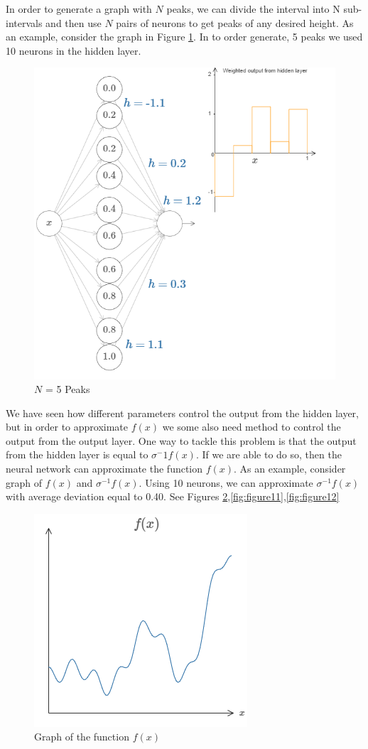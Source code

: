 \documentclass{article}
\begin{document}
In order to generate a graph with $N$ peaks, we can divide the interval into N sub-intervals and then use $N$ pairs of neurons to get peaks of any  desired height. As an example, consider the graph in Figure \ref{fig:figure9}. In to order generate, 5 peaks we used 10 neurons in the hidden layer.

\begin{figure}[h!]
    \centering
    \includegraphics[width=0.8 \textwidth]{Images/2/8.png}
    \caption{$N$ = 5 Peaks}
    \label{fig:figure9}
\end{figure}

We have seen how different parameters control the output from the hidden layer, but in order to approximate $f(x)$ we some also need method to control the output from the output layer. One way to tackle this problem is that the output from the hidden layer is equal to $\sigma^-1 f(x)$. If we are able to do so, then the neural network can approximate the function $f(x)$. As an example, consider graph of $f(x)$ and $\sigma^{-1} f(x)$. Using 10 neurons, we can approximate $\sigma^{-1} f(x)$ with average deviation equal to 0.40. See Figures \ref{fig:figure10},\ref{fig:figure11},\ref{fig:figure12}



\begin{figure}[h!]

\centering
    \includegraphics[width=0.4 \textwidth]{Images/2/22.png}
    \caption{Graph of the function $f(x)$}
    \label{fig:figure10}
\end{figure}
\end{document}
